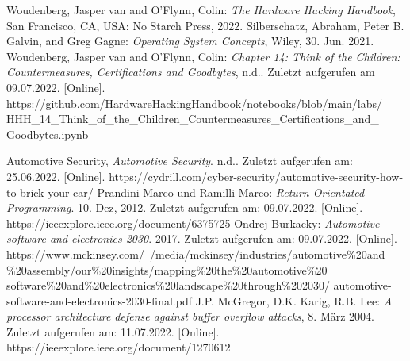 \documentclass[a4paper,
DIV=13,
12pt,
BCOR=10mm,
department=FakIM,
oneside,
parskip=half,
automark,
listof=totocnumbered,
bibliography=totocnumbered,
acronym=totocnumbered
] {OTHRartcl}
\begin{document}
\begin{appendix}
\newpage
\listoffigures

\cleardoublepage
\newpage

\begin{thebibliography}{99}
 Woudenberg, Jasper van and O'Flynn, Colin: \textit{The Hardware Hacking Handbook}, San Francisco, CA, USA: No Starch Press, 2022.
 Silberschatz, Abraham, Peter B. Galvin, and Greg Gagne: \textit{Operating System Concepts}, Wiley, 30. Jun. 2021.
 Woudenberg, Jasper van and O'Flynn, Colin: \textit{Chapter 14: Think of the Children: Countermeasures, Certifications and Goodbytes}, n.d.. Zuletzt aufgerufen am 09.07.2022. [Online]. https://github.com/HardwareHackingHandbook/notebooks/blob/main/labs/ HHH\_14\_Think\_of\_the\_Children\_Countermeasures\_Certifications\_and\_ Goodbytes.ipynb



 Automotive Security, \textit{Automotive Security}. n.d.. Zuletzt aufgerufen am: 25.06.2022. [Online]. https://cydrill.com/cyber-security/automotive-security-how-to-brick-your-car/ %
 Prandini Marco und Ramilli Marco: \textit{Return-Orientated Programming}. 10. Dez, 2012. Zuletzt aufgerufen am: 09.07.2022. [Online]. https://ieeexplore.ieee.org/document/6375725
  Ondrej Burkacky: \textit{Automotive software and electronics 2030}. 2017. Zuletzt aufgerufen am: 09.07.2022. [Online]. https://www.mckinsey.com/~/media/mckinsey/industries/automotive\%20and \%20assembly/our\%20insights/mapping\%20the\%20automotive\%20 software\%20and\%20electronics\%20landscape\%20through\%202030/ automotive-software-and-electronics-2030-final.pdf
 J.P. McGregor, D.K. Karig, R.B. Lee: \textit{A processor architecture defense against buffer overflow attacks}, 8. März 2004. Zuletzt aufgerufen am: 11.07.2022. [Online]. https://ieeexplore.ieee.org/document/1270612




\end{thebibliography}
\end{appendix}
\end{document}
